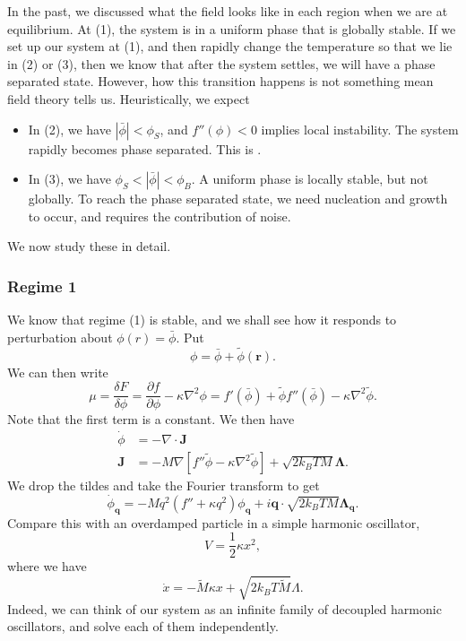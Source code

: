 \documentclass[a4paper]{article}
\begin{document}
In the past, we discussed what the field looks like in each region when we are at equilibrium. At (1), the system is in a uniform phase that is globally stable. If we set up our system at (1), and then rapidly change the temperature so that we lie in (2) or (3), then we know that after the system settles, we will have a phase separated state. However, how this transition happens is not something mean field theory tells us. Heuristically, we expect

\begin{itemize}
  \item In (2), we have $|\bar{\phi}| < \phi_S$, and $f''(\phi) < 0$ implies local instability. The system rapidly becomes phase separated. This is .
  \item In (3), we have $\phi_S < |\bar{\phi}| < \phi_B$. A uniform phase is locally stable, but not globally. To reach the phase separated state, we need nucleation and growth to occur, and requires the contribution of noise.
\end{itemize}
We now study these in detail.
\subsubsection*{Regime 1}
We know that regime (1) is stable, and we shall see how it responds to perturbation about $\phi(r) = \bar{\phi}$. Put
\[
  \phi = \bar{\phi} + \tilde{\phi}(\mathbf{r}).
\]
We can then write
\[
  \mu = \frac{\delta F}{\delta \phi} = \frac{\partial f}{\partial \phi} - \kappa \nabla^2 \phi = f'(\bar{\phi}) + \tilde{\phi} f''(\bar{\phi}) - \kappa \nabla^2 \tilde{\phi}.
\]
Note that the first term is a constant. We then have
\begin{align*}
  \dot{\phi} &= - \nabla \cdot \mathbf{J}\\
  \mathbf{J} &= -M \nabla [f''\tilde{\phi} - \kappa \nabla^2 \tilde{\phi}] + \sqrt{2k_B T M} \boldsymbol\Lambda.
\end{align*}
We drop the tildes and take the Fourier transform to get
\[
  \dot{\phi}_{\mathbf{q}} = - M q^2 (f'' + \kappa q^2)\phi_{\mathbf{q}} + i\mathbf{q} \cdot \sqrt{2k_B TM} \boldsymbol\Lambda_{\mathbf{q}}.
\]
Compare this with an overdamped particle in a simple harmonic oscillator,
\[
  V = \frac{1}{2} \kappa x^2,
\]
where we have
\[
  \dot{x} = - \tilde{M} \kappa x + \sqrt{2k_B T \tilde{M}} \Lambda.
\]
Indeed, we can think of our system as an infinite family of decoupled harmonic oscillators, and solve each of them independently.
\end{document}
